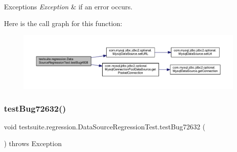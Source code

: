 \begin{DoxyExceptions}{Exceptions}
{\em Exception} & if an error occurs. \\
\hline
\end{DoxyExceptions}
Here is the call graph for this function\+:
\nopagebreak
\begin{figure}[H]
\begin{center}
\leavevmode
\includegraphics[width=350pt]{classtestsuite_1_1regression_1_1_data_source_regression_test_a549c69563bb8fff0dbc64c72d6867f69_cgraph}
\end{center}
\end{figure}
\mbox{\label{classtestsuite_1_1regression_1_1_data_source_regression_test_abba082ff766209732ff52f20bfe77cae}} 
\subsubsection{\texorpdfstring{test\+Bug72632()}{testBug72632()}}
{\footnotesize\ttfamily void testsuite.\+regression.\+Data\+Source\+Regression\+Test.\+test\+Bug72632 (\begin{DoxyParamCaption}{ }\end{DoxyParamCaption}) throws Exception}

